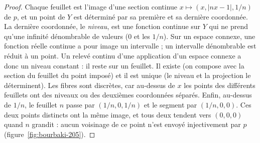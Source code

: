 \begin{proof}
Chaque feuillet est l'image d'une section continue $x \mapsto (x, |nx - 1|, 1/n)$ de $p$, et un point de $Y$ est déterminé par sa première et sa dernière coordonnée. La dernière coordonnée, le \emph{niveau}, est une fonction continue sur $Y$ qui ne prend qu'une infinité dénombrable de valeurs ($0$ et les $1/n$). Sur un espace connexe, une fonction réelle continue a pour image un intervalle ; un intervalle dénombrable est réduit à un point. Un relevé continu d'une application d'un espace connexe a donc un niveau constant : il reste sur un feuillet. Il existe (on compose avec la section du feuillet du point imposé) et il est unique (le niveau et la projection le déterminent). Les fibres sont discrètes, car au-dessus de $x$ les points des différents feuillets ont des niveaux ou des deuxièmes coordonnées séparés. Enfin, au-dessus de $1/n$, le feuillet $n$ passe par $(1/n, 0, 1/n)$ et le segment par $(1/n, 0, 0)$. Ces deux points distincts ont la même image, et tous deux tendent vers $(0, 0, 0)$ quand $n$ grandit : aucun voisinage de ce point n'est envoyé injectivement par $p$ (figure~\ref{fig:bourbaki-205}).
\end{proof}

